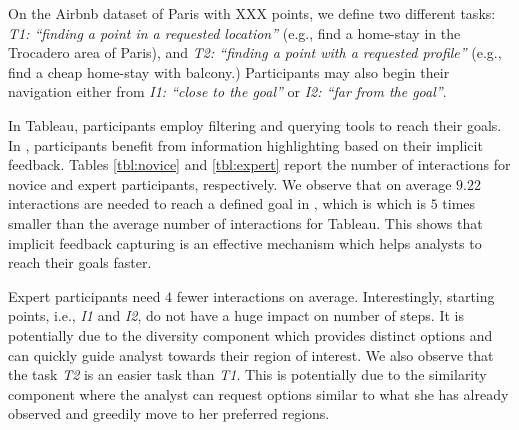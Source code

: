 \vspace{2pt}
On the Airbnb dataset of Paris with XXX points, we define two different tasks: {\em T1: ``finding a point in a requested location''} (e.g., find a home-stay in the Trocadero area of Paris), and {\em T2: ``finding a point with a requested profile''} (e.g., find a cheap home-stay with balcony.) Participants may also begin their navigation either from {\em I1: ``close to the goal''} or {\em I2: ``far from the goal''}. 

\vspace{2pt}
In {\sc Tableau}, participants employ filtering and querying tools to reach their goals. In \sgg, participants benefit from information highlighting based on their implicit feedback. Tables \ref{tbl:novice} and \ref{tbl:expert} report the number of interactions for novice and expert participants, respectively. We observe that on average $9.22$ interactions are needed to reach a defined goal in \sgg, which is  which is $5$ times smaller than the average number of interactions for {\sc Tableau}. This shows that implicit feedback capturing is an effective mechanism which helps analysts to reach their goals faster.

\vspace{2pt}
Expert participants need $4$ fewer interactions on average. Interestingly, starting points, i.e., {\em I1} and {\em I2}, do not have a huge impact on number of steps. It is potentially due to the diversity component which provides distinct options and can quickly guide analyst towards their region of interest. We also observe that the task {\em T2} is an easier task than {\em T1}. This is potentially due to the similarity component where the analyst can request options similar to what she has already observed and greedily move to her preferred regions.

